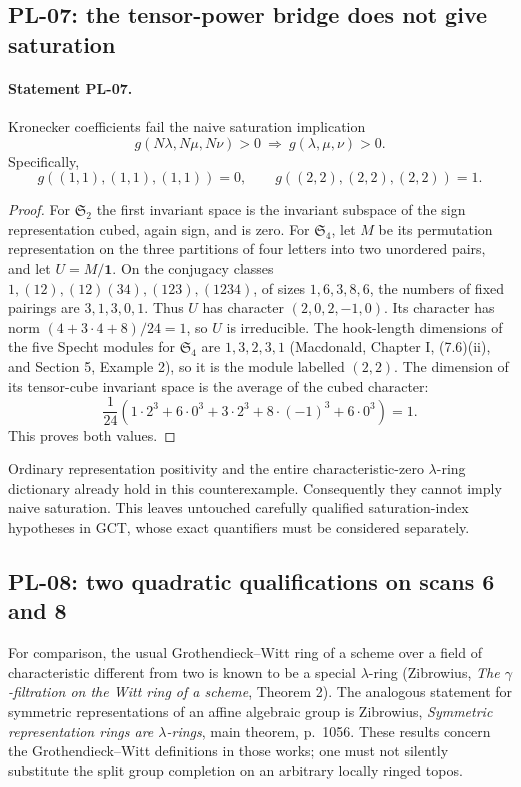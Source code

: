 \subsection{PL-07: the tensor-power bridge does not give saturation}
\paragraph{Statement PL-07.}
Kronecker coefficients fail the naive saturation implication
\[
 g(N\lambda,N\mu,N\nu)>0\ \Longrightarrow\ g(\lambda,\mu,\nu)>0.
\]
Specifically,
\[
 g((1,1),(1,1),(1,1))=0,\qquad
 g((2,2),(2,2),(2,2))=1.
\]

\begin{proof}
For $\mathfrak S_2$ the first invariant space is the invariant subspace of
the sign representation cubed, again sign, and is zero.
For $\mathfrak S_4$, let $M$ be its permutation representation on the
three partitions of four letters into two unordered pairs, and let
$U=M/\mathbf1$. On the conjugacy classes
$1,(12),(12)(34),(123),(1234)$, of sizes $1,6,3,8,6$, the numbers of
fixed pairings are $3,1,3,0,1$. Thus $U$ has character
$(2,0,2,-1,0)$. Its character has norm
$(4+3\cdot4+8)/24=1$, so $U$ is irreducible. The hook-length dimensions
of the five Specht modules for $\mathfrak S_4$ are $1,3,2,3,1$
(Macdonald, Chapter I, (7.6)(ii), and Section 5, Example 2), so it is
the module labelled $(2,2)$. The dimension of its tensor-cube invariant
space is the average of the cubed character:
\[
 \frac{1}{24}(1\cdot2^3+6\cdot0^3+3\cdot2^3+8\cdot(-1)^3+6\cdot0^3)
 =1.
\]
This proves both values.
\end{proof}

Ordinary representation positivity and the entire characteristic-zero
$\lambda$-ring dictionary already hold in this counterexample. Consequently
they cannot imply naive saturation. This leaves untouched carefully
qualified saturation-index hypotheses in GCT, whose exact quantifiers must
be considered separately.

\subsection{PL-08: two quadratic qualifications on scans 6 and 8}
For comparison, the usual Grothendieck--Witt ring of a scheme over a field
of characteristic different from two is known to be a special
$\lambda$-ring (Zibrowius, \emph{The $\gamma$-filtration on the Witt ring of
a scheme}, Theorem 2). The analogous statement for symmetric representations
of an affine algebraic group is Zibrowius, \emph{Symmetric representation
rings are $\lambda$-rings}, main theorem, p.~1056. These results concern
the Grothendieck--Witt definitions in those works; one must not silently
substitute the split group completion on an arbitrary locally ringed topos.
